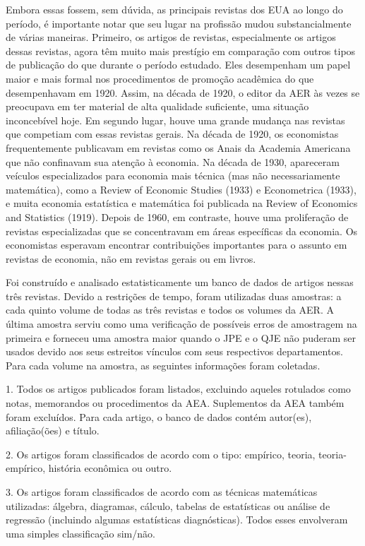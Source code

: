 \documentclass[12pt]{article}
\begin{document}
Embora essas fossem, sem dúvida, as principais revistas dos EUA ao longo do período, é importante notar que seu lugar na profissão mudou substancialmente de várias maneiras. Primeiro, os artigos de revistas, especialmente os artigos dessas revistas, agora têm muito mais prestígio em comparação com outros tipos de publicação do que durante o período estudado. Eles desempenham um papel maior e mais formal nos procedimentos de promoção acadêmica do que desempenhavam em 1920. Assim, na década de 1920, o editor da AER às vezes se preocupava em ter material de alta qualidade suficiente, uma situação inconcebível hoje. Em segundo lugar, houve uma grande mudança nas revistas que competiam com essas revistas gerais. Na década de 1920, os economistas frequentemente publicavam em revistas como os Anais da Academia Americana que não confinavam sua atenção à economia. Na década de 1930, apareceram veículos especializados para economia mais técnica (mas não necessariamente matemática), como a Review of Economic Studies (1933) e Econometrica (1933), e muita economia estatística e matemática foi publicada na Review of Economics and Statistics (1919). Depois de 1960, em contraste, houve uma proliferação de revistas especializadas que se concentravam em áreas específicas da economia. Os economistas esperavam encontrar contribuições importantes para o assunto em revistas de economia, não em revistas gerais ou em livros.

Foi construído e analisado estatisticamente um banco de dados de artigos nessas três revistas. Devido a restrições de tempo, foram utilizadas duas amostras: a cada quinto volume de todas as três revistas e todos os volumes da AER. A última amostra serviu como uma verificação de possíveis erros de amostragem na primeira e forneceu uma amostra maior quando o JPE e o QJE não puderam ser usados devido aos seus estreitos vínculos com seus respectivos departamentos. Para cada volume na amostra, as seguintes informações foram coletadas.

1. Todos os artigos publicados foram listados, excluindo aqueles rotulados como notas, memorandos ou procedimentos da AEA. Suplementos da AEA também foram excluídos. Para cada artigo, o banco de dados contém autor(es), afiliação(ões) e título.

2. Os artigos foram classificados de acordo com o tipo: empírico, teoria, teoria-empírico, história econômica ou outro.

3. Os artigos foram classificados de acordo com as técnicas matemáticas utilizadas: álgebra, diagramas, cálculo, tabelas de estatísticas ou análise de regressão (incluindo algumas estatísticas diagnósticas). Todos esses envolveram uma simples classificação sim/não.
\end{document}
